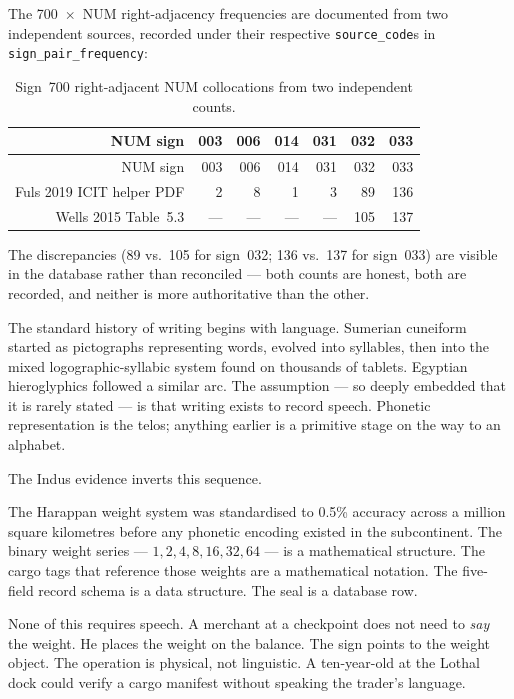 The 700~$\times$~NUM right-adjacency frequencies are documented from
two independent sources, recorded under their respective
\texttt{source\_code}s in \texttt{sign\_pair\_frequency}:

\begin{longtable}{@{}rrrrrrr@{}}
\caption{Sign~700 right-adjacent NUM collocations from two
independent counts.}
\label{tab:sign700}\\
\toprule
NUM sign       & 003 & 006 & 014 & 031 & 032 & 033 \\
\midrule
\endfirsthead
\toprule
NUM sign       & 003 & 006 & 014 & 031 & 032 & 033 \\
\midrule
\endhead
\bottomrule
\endlastfoot
Fuls 2019 ICIT helper PDF & 2 & 8 & 1 & 3 & 89 & 136 \\
\midrule
Wells 2015 Table~5.3      & --- & --- & --- & --- & 105 & 137 \\
\end{longtable}

\noindent
The discrepancies (89 vs.~105 for sign~032; 136 vs.~137 for sign~033)
are visible in the database rather than reconciled --- both counts
are honest, both are recorded, and neither is more authoritative
than the other.

The standard history of writing begins with language. Sumerian
cuneiform started as pictographs representing words, evolved into
syllables, then into the mixed logographic-syllabic system found
on thousands of tablets. Egyptian hieroglyphics followed a similar
arc. The assumption --- so deeply embedded that it is rarely
stated --- is that writing exists to record speech. Phonetic
representation is the telos; anything earlier is a primitive stage
on the way to an alphabet.

The Indus evidence inverts this sequence.

The Harappan weight system was standardised to 0.5\% accuracy
across a million square kilometres before any phonetic encoding
existed in the subcontinent. The binary weight series ---
$1, 2, 4, 8, 16, 32, 64$ --- is a mathematical structure. The
cargo tags that reference those weights are a mathematical
notation. The five-field record schema is a data structure. The
seal is a database row.

None of this requires speech. A merchant at a checkpoint does not
need to \emph{say} the weight. He places the weight on the balance.
The sign points to the weight object. The operation is physical,
not linguistic. A ten-year-old at the Lothal dock could verify a
cargo manifest without speaking the trader's language.

